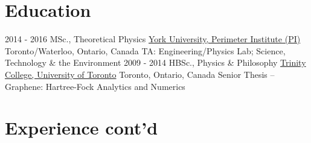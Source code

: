 \documentclass[letterpaper]{twentysecondcv} %
\begin{document}
\section{Education}

\begin{twenty} %
	\twentyitem
    	{2014 - 2016}
        {MSc., Theoretical Physics}
        {\href{http://www.yorku.ca/}{York University, Perimeter Institute (PI)}}
        {Toronto/Waterloo, Ontario, Canada}
        {TA: Engineering/Physics Lab; Science, Technology \& the Environment}
	\twentyitem
    	{2009 - 2014}
        {HBSc., Physics \& Philosophy}
        {\href{https://www.utoronto.ca/}{Trinity College, University of Toronto}}
        {Toronto, Ontario, Canada}
        {Senior Thesis -- Graphene: Hartree-Fock Analytics and Numerics}
\end{twenty}



\vfill

\newpage
{}


\section{Experience cont'd}
\end{document}
